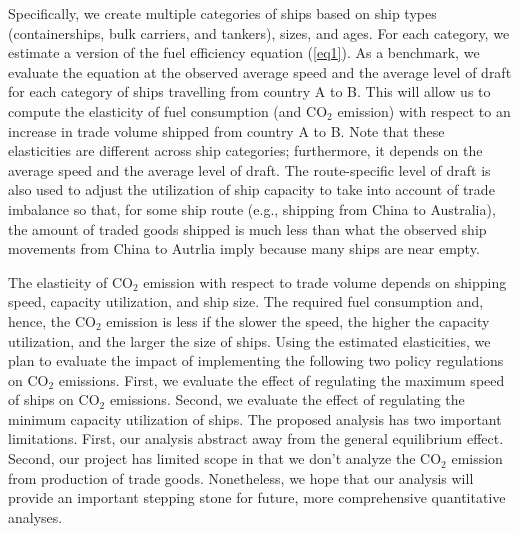 \documentclass[hidelinks, 12pt,letterpaper]{article}
\begin{document}
Specifically, we create multiple categories of ships based on ship types (containerships, bulk carriers, and tankers), sizes, and ages. For each category, we estimate a version of the fuel efficiency equation (\ref{eq1}). As a benchmark, we evaluate the equation at the observed average speed and the average level of draft for each category of ships travelling from country A to B. This will allow us to compute the elasticity of fuel consumption (and CO$_2$ emission) with respect to an increase in trade volume shipped from country A to  B.  Note that these elasticities are different across ship categories; furthermore, it depends on the average speed and the average level of draft. The route-specific level of draft is also used to adjust the utilization of ship capacity to take into account of trade imbalance so that, for some ship route (e.g., shipping from China to Australia), the amount of traded goods shipped is much less than what the observed ship movements from China to Autrlia imply because many ships are near empty. 


The elasticity of  CO$_2$ emission with respect to trade volume depends on shipping speed, capacity utilization, and ship size. The required  fuel consumption and, hence, the CO$_2$ emission is less if the slower the speed, the higher the capacity utilization, and the larger the size of ships.  Using the estimated elasticities, we plan to evaluate the impact of implementing  the following two policy regulations on CO$_2$ emissions. First, we evaluate the effect of regulating the maximum speed of ships on CO$_2$ emissions. Second, we evaluate the effect of regulating the minimum capacity utilization of ships. The proposed analysis has two important limitations. First,  our analysis abstract away from the general equilibrium effect. Second, our project has limited scope in that we don't analyze the CO$_2$ emission from production of trade goods. Nonetheless, we hope that our analysis will provide an important stepping stone for future, more comprehensive quantitative analyses. 



 

%
%
%

\pagebreak

\singlespace{

}
\end{document}
